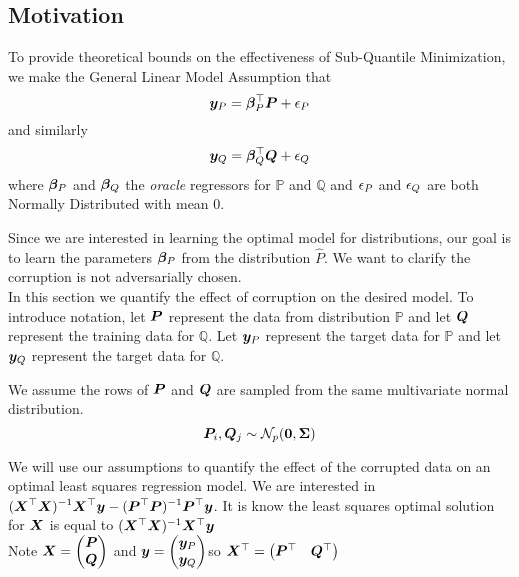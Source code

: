 \documentclass{article} %
\begin{document}
	\subsection{Motivation}
	\begin{assumption}\label{asm:normal-corruption}
		To provide theoretical bounds on the effectiveness of Sub-Quantile Minimization, we make the General Linear Model Assumption that
		\begin{equation}\vspace{1em}
			\vy_P = \vbeta_P^\top\mP  + \eps_P
		\end{equation}
		and similarly 
		\begin{equation}
			{\bm{y}}_Q = {\bm{\beta}}_Q^\top {\bm{Q}} + {\epsilon}_Q
		\end{equation}
		where ${\bm{\beta}}_P$ and ${\bm{\beta}}_Q$ the \textit{oracle} regressors for $\mathbb{P}$ and $\mathbb{Q}$ and ${\epsilon}_P$ and ${\epsilon}_Q$ are both Normally Distributed with mean $0$.  
	\end{assumption}
	Since we are interested in learning the optimal model for distributions, our goal is to learn the parameters ${\bm{\beta}}_P$ from the distribution $\hat{P}$. We want to clarify the corruption is not adversarially chosen. \\
	In this section we quantify the effect of corruption on the desired model. To introduce notation, let ${\bm{P}}$ represent the data from distribution $\mathbb{P}$ and let ${\bm{Q}}$ represent the training data for $\mathbb{Q}$. Let ${\bm{y}}_P$ represent the target data for $\mathbb{P}$ and let ${\bm{y}}_Q$ represent the target data for $\mathbb{Q}$.\\
	\begin{assumption}\label{asm:p-q-sample}
		We assume the rows of ${\bm{P}}$ and ${\bm{Q}}$ are sampled from the same multivariate normal distribution. \vspace{1em}
		\begin{equation}
			{\bm{P}}_i,{\bm{Q}}_j \sim \mathcal{N}_p(\mathbf{0},{\bm{\Sigma}})
		\end{equation}
	\end{assumption}
	
	We will use our assumptions to quantify the effect of the corrupted data on an optimal least squares regression model. We are interested in $\displaystyle ({\bm{X}}^\top{\bm{X}})^{-1}{\bm{X}}^\top{\bm{y}} - ({\bm{P}}^\top{\bm{P}})^{-1}{\bm{P}}^\top{\bm{y}}$.
	It is know the least squares optimal solution for ${\bm{X}}$ is equal to $({\bm{X}}^\top{\bm{X}})^{-1}{\bm{X}}^\top{\bm{y}}$\\
	Note $\displaystyle {\bm{X}} = \begin{pmatrix}{\bm{P}} \\ {\bm{Q}} \end{pmatrix}$ and $\displaystyle {\bm{y}} = \begin{pmatrix} {\bm{y}}_P \\ {\bm{y}}_Q \end{pmatrix} $so ${\bm{X}}^\top = \begin{pmatrix}{\bm{P}}^\top & {\bm{Q}}^\top \end{pmatrix}$\\
	
\end{document}
